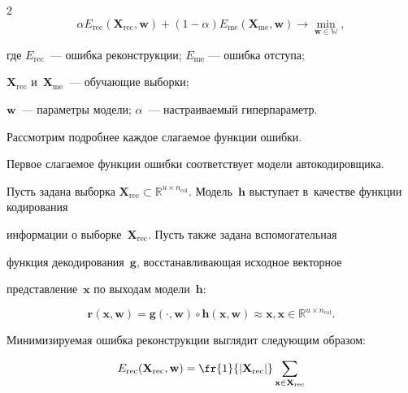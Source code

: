 \begin{multicols}{2}
\begin{equation}
\label{eq:alpha}


\alpha E_{\mathrm{rec}}\left(\mathbf{X}_{\mathrm{rec}}, \mathbf{w}\right) + (1 - 


\alpha)E_{\mathrm{me}}(\mathbf{X}_{\mathrm{me}},\mathbf{w}) \to \min_{\mathbf{w} \in 


\mathbb{W}},


\end{equation}


где $E_{\mathrm{rec}}$~--- ошибка реконструкции; $E_{\mathrm{me}}$ --- ошибка отступа; 


$\mathbf{X}_{\mathrm{rec}}$ и~$\mathbf{X}_{\mathrm{me}}$~--- обучающие выборки;  


$\mathbf{w}$~--- параметры модели; $\alpha$~--- настраиваемый гиперпараметр.


Рассмотрим подробнее каждое слагаемое функции ошибки.





Первое слагаемое функции ошибки соответствует модели автокодировщика.


Пусть задана выбор\-ка $\mathbf{X}_{\mathrm{rec}} \subset \mathbb{R}^{u \times 


n_{\mathrm{col}}}$.  Модель~$\mathbf{h}$ выступает в~качестве функции кодирования 


информации о выборке~$\mathbf{X}_{\mathrm{rec}}$. Пусть также задана вспомогательная 


функция декодирования~$\mathbf{g}$, восстанавливающая исходное векторное 


представление~$\mathbf{x}$ по выходам модели~$\mathbf{h}$:


$$


   \mathbf{r}(\mathbf{x}, \mathbf{w}) = \mathbf{g}(\cdot, \mathbf{w}) \circ 


\mathbf{h} (\mathbf{x}, \mathbf{w}) \approx  \mathbf{x},  \mathbf{x} \in 


\mathbb{R}^{u \times n_{\mathrm{col}}}.


$$


Минимизируемая ошибка реконструкции выглядит следующим образом:


\begin{equation}


\label{eq:rec}


E_{\mathrm{rec}}(\mathbf{X}_{\mathrm{rec}}, \mathbf{w}) = 


\fr{1}{|\mathbf{X}_{\mathrm{rec}}|}\sum\limits_{\mathbf{x} \in \mathbf{X}_{\mathrm{rec}}} 



\end{equation}
\end{multicols}
